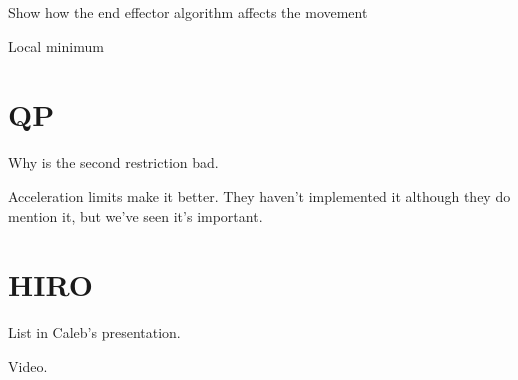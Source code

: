 Show how the end effector algorithm affects the movement

Local minimum


\section{QP}

Why is the second restriction bad.

Acceleration limits make it better. They haven't implemented it although they do mention it, but we've seen it's important.

\section{HIRO}

List in Caleb's presentation.

Video.

